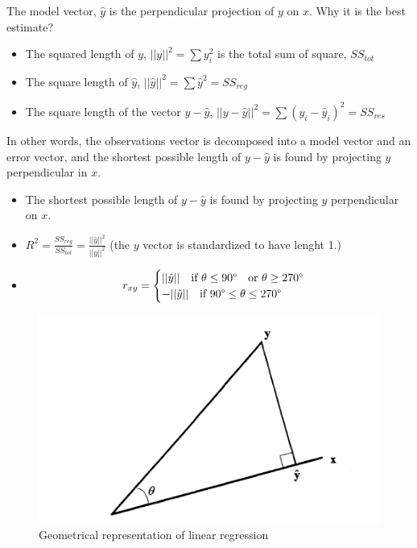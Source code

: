 \documentclass[
]{report}
\providecommand{\tightlist}{%
  \setlength{\itemsep}{0pt}\setlength{\parskip}{0pt}}
\begin{document}
The model vector, \(\hat{y}\) is the perpendicular projection of \(y\) on \(x\). Why it is the best estimate?

\begin{itemize}
\tightlist
\item
  The squared length of \(y\), \(||y||^2 = \sum y_i^2\) is the total sum of square, \(SS_{tot}\)
\item
  The square length of \(\hat{y}\), \(||\hat{y}||^2= \sum \hat{y}^2=SS_{reg}\)
\item
  The square length of the vector \(y-\hat{y}\), \(||y - \hat{y}||^2=\sum(y_i-\hat{y}_i)^2 = SS_{res}\)
\end{itemize}

In other words, the observations vector is decomposed into a model vector and an error vector, and the shortest possible length of \(y-\hat{y}\) is found by projecting \(y\) perpendicular in \(x\).

\begin{itemize}
\tightlist
\item
  The shortest possible length of \(y - \hat{y}\) is found by projecting \(y\) perpendicular on \(x\).
\item
  \(R^2 = \frac{SS_{reg}}{SS_{tot}}= \frac{||\hat{y}||^2}{||y||^2}\) (the \(y\) vector is standardized to have lenght 1.)
\item
  \[r_{xy} = 
  \begin{cases} ||\hat{y}||  \ \ \ \text{if}  \  \theta \leq 90 \degree \ \ \ \text{or} \ \theta \geq 270 \degree  \\ -||\hat{y}|| \ \ \ \text{if}  \ 90\degree \leq \theta \leq 270\degree
  \end{cases}\]
\end{itemize}

\begin{figure}
    \centering
    \includegraphics[width= 250 pt]{bring1.PNG}
    \caption{Geometrical representation of linear regression}
\end{figure}
\end{document}
